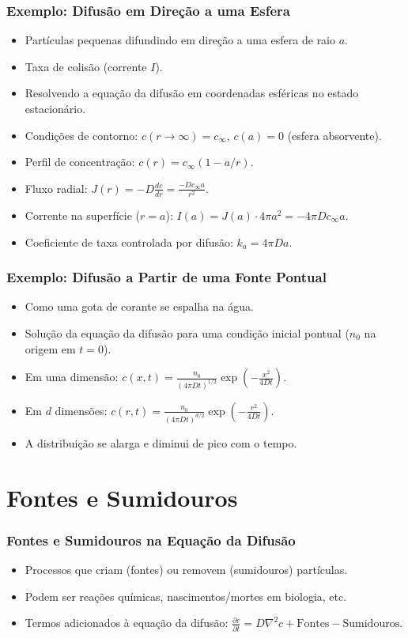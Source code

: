 \documentclass[11pt]{beamer}
\begin{document}
\begin{frame}
    \frametitle{Exemplo: Difusão em Direção a uma Esfera}
    \begin{itemize}
        \item Partículas pequenas difundindo em direção a uma esfera de raio $a$.
        \item Taxa de colisão (corrente $I$).
        \item Resolvendo a equação da difusão em coordenadas esféricas no estado estacionário.
        \item Condições de contorno: $c(r \rightarrow \infty) = c_\infty$, $c(a) = 0$ (esfera absorvente).
        \item Perfil de concentração: $c(r) = c_\infty (1 - a/r)$.
        \item Fluxo radial: $J(r) = -D \frac{dc}{dr} = \frac{-Dc_\infty a}{r^2}$.
        \item Corrente na superfície ($r=a$): $I(a) = J(a) \cdot 4\pi a^2 = -4\pi Dc_\infty a$.
        \item Coeficiente de taxa controlada por difusão: $k_a = 4\pi Da$.
    \end{itemize}
\end{frame}

\begin{frame}
    \frametitle{Exemplo: Difusão a Partir de uma Fonte Pontual}
    \begin{itemize}
        \item Como uma gota de corante se espalha na água.
        \item Solução da equação da difusão para uma condição inicial pontual ($n_0$ na origem em $t=0$).
        \item Em uma dimensão: $c(x,t) = \frac{n_0}{(4\pi Dt)^{1/2}} \exp\left(-\frac{x^2}{4Dt}\right)$.
        \item Em $d$ dimensões: $c(r,t) = \frac{n_0}{(4\pi Dt)^{d/2}} \exp\left(-\frac{r^2}{4Dt}\right)$.
        \item A distribuição se alarga e diminui de pico com o tempo.
    \end{itemize}
\end{frame}

\section{Fontes e Sumidouros}

\begin{frame}
    \frametitle{Fontes e Sumidouros na Equação da Difusão}
    \begin{itemize}
        \item Processos que criam (fontes) ou removem (sumidouros) partículas.
        \item Podem ser reações químicas, nascimentos/mortes em biologia, etc.
        \item Termos adicionados à equação da difusão: $\frac{\partial c}{\partial t} = D \nabla^2 c + \text{Fontes} - \text{Sumidouros}$.
    \end{itemize}
\end{frame}
\end{document}
